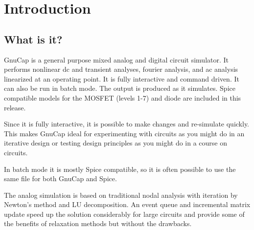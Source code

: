 %
%
%
%
\chapter{Introduction}
\section{What is it?}

GnuCap is a general purpose mixed analog and digital circuit simulator.
It performs nonlinear dc and transient analyses, fourier analysis, and
ac analysis linearized at an operating point.  It is fully interactive
and command driven.  It can also be run in batch mode.  The output is
produced as it simulates.  Spice compatible models for the MOSFET
(levels 1-7) and diode are included in this release.

Since it is fully interactive, it is possible to make changes and re-simulate
quickly.  This makes GnuCap ideal for experimenting with circuits as you might
do in an iterative design or testing design principles as you might do in a
course on circuits.

In batch mode it is mostly Spice compatible, so it is often possible to use
the same file for both GnuCap and Spice.

The analog simulation is based on traditional nodal analysis with iteration
by Newton's method and LU decomposition.  An event queue and incremental
matrix update speed up the solution considerably for large circuits and
provide some of the benefits of relaxation methods but without the drawbacks.

